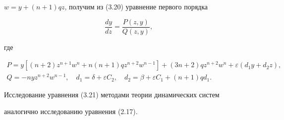 $w=y+(n+1)q z$, получим из (3.20) уравнение первого порядка 


\begin{equation} 


\frac{dy}{dz}=\frac{P(z,y)}{Q(z,y)}, \tag{3.21} 


\end{equation} 


где 


\begin{gather*} 


P=y[(n+2)z^{n+1}w^n+n(n+1)q z^{n+2}w^{n-1}]+ 


(3n+2)q z^{n+2}w^n+\varepsilon(d_1y+d_2z),\\ 


Q=-n y z^{n+2}w^{n-1},\quad 


d_1=\delta+\varepsilon C_2,\quad 


d_2=\beta+\varepsilon C_1+(n+1)q d_1. 


\end{gather*} 


Исследование уравнения (3.21) методами теории динамических систем 


аналогично исследованию уравнения (2.17). 


 


 


